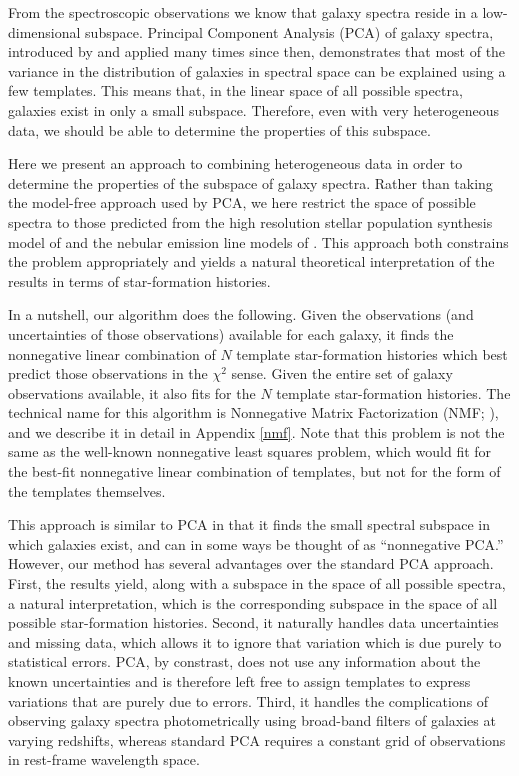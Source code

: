 \documentclass[10pt,preprint]{aastex}
\begin{document}
From the spectroscopic observations we know that galaxy spectra reside
in a low-dimensional subspace. Principal Component Analysis (PCA) of
galaxy spectra, introduced by \citet{connolly95b} and applied many
times since then, demonstrates that most of the variance in the
distribution of galaxies in spectral space can be explained using a
few templates. This means that, in the linear space of all possible
spectra, galaxies exist in only a small subspace. Therefore, even with
very heterogeneous data, we should be able to determine the properties
of this subspace.

Here we present an approach to combining heterogeneous data in order
to determine the properties of the subspace of galaxy spectra. Rather
than taking the model-free approach used by PCA, we here restrict the
space of possible spectra to those predicted from the high resolution
stellar population synthesis model of \citet{bruzual03a} and the
nebular emission line models of \citet{kewley01a}.  This approach both
constrains the problem appropriately and yields a natural theoretical
interpretation of the results in terms of star-formation histories.

In a nutshell, our algorithm does the following. Given the
observations (and uncertainties of those observations) available for
each galaxy, it finds the nonnegative linear combination of $N$
template star-formation histories which best predict those
observations in the $\chi^2$ sense. Given the entire set of galaxy
observations available, it also fits for the $N$ template
star-formation histories. The technical name for this algorithm is
Nonnegative Matrix Factorization (NMF; \citealt{lee99a, lee00a}), and
we describe it in detail in Appendix \ref{nmf}. Note that this problem
is not the same as the well-known nonnegative least squares problem,
which would fit for the best-fit nonnegative linear combination of
templates, but not for the form of the templates themselves.

This approach is similar to PCA in that it finds the small spectral
subspace in which galaxies exist, and can in some ways be thought of
as ``nonnegative PCA.''  However, our method has several advantages
over the standard PCA approach. First, the results yield, along with a
subspace in the space of all possible spectra, a natural
interpretation, which is the corresponding subspace in the space of
all possible star-formation histories. Second, it naturally handles
data uncertainties and missing data, which allows it to ignore that
variation which is due purely to statistical errors. PCA, by
constrast, does not use any information about the known uncertainties
and is therefore left free to assign templates to express variations
that are purely due to errors. Third, it handles the complications of
observing galaxy spectra photometrically using broad-band filters of
galaxies at varying redshifts, whereas standard PCA requires a
constant grid of observations in rest-frame wavelength space.
\end{document}
